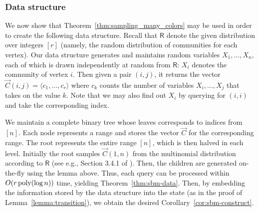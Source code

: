 \subsubsection{Data structure}
We now show that Theorem~\ref{thm:sampling_many_colors} may be used in order to create the following data structure.
Recall that $\mathsf{R}$ denote the given distribution over integers $[r]$ (namely, the random distribution of communities for each vertex).
Our data structure generates and maintains random variables $X_1, \ldots, X_n$,
each of which is drawn independently at random from $\mathsf{R}$: $X_i$ denotes the community of vertex $i$.
Then given a pair $(i, j)$, it returns the vector $\vec{C}(i, j) = \langle c_1, \ldots, c_r \rangle$
where $c_k$ counts the number of variables $X_i, \ldots, X_j$ that takes on the value $k$.
Note that we may also find out $X_i$ by querying for $(i, i)$ and take the corresponding index.

We maintain a complete binary tree whose leaves corresponds to indices from $[n]$.
Each node represents a range and stores the vector $\vec{C}$ for the corresponding range.
The root represents the entire range $[n]$, which is then halved in each level.
Initially the root samples $\vec{C}(1, n)$ from the multinomial distribution according to $\mathsf{R}$
(see e.g., Section 3.4.1 of \cite{knuth}).
Then, the children are generated on-the-fly using the lemma above.
Thus, each query can be processed within $O(r\,\mathrm{poly}(\log n))$ time, yielding Theorem~\ref{thm:sbm-data}.
Then, by embedding the information stored by the data structure into the state (as in the proof of Lemma~\ref{lemma:transition}),
we obtain the desired Corollary~\ref{cor:sbm-construct}.
